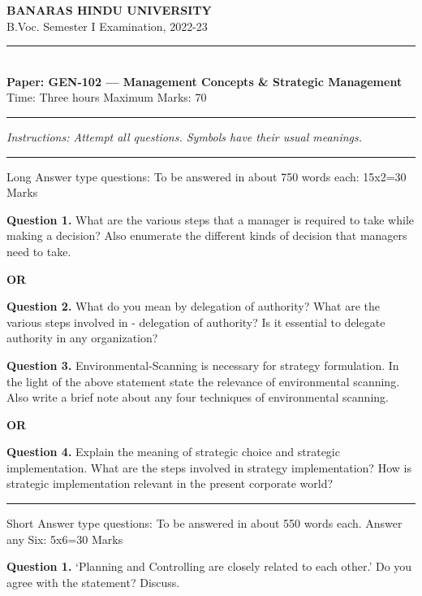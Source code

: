 \documentclass[11pt,a4paper]{article}
\begin{document}
\begin{center}
  {\large\bfseries BANARAS HINDU UNIVERSITY}\\[2pt]
  {\normalsize B.Voc. Semester I Examination, 2022-23}\\[6pt]
  \rule{0.8\linewidth}{0.5pt}\\[6pt]
  {\large\bfseries Paper: GEN-102 --- Management Concepts & Strategic Management}\\[4pt]
  {\normalsize Time: Three hours \hfill Maximum Marks: 70}
\end{center}

\rule{\linewidth}{0.4pt}

\smallskip
\noindent\textit{Instructions: Attempt all questions. Symbols have their usual meanings.}

\bigskip


\bigskip{}
\rule{\linewidth}{0.4pt}\smallskip

Long Answer type questions:
To be answered in about 750 words each: 15x2=30 Marks

\medskip\noindent\textbf{Question 1.} What are the various steps that a manager is required to take while making a decision?
Also enumerate the different kinds of decision that managers need to take.
\centerline{\textbf{OR}}

\medskip\noindent\textbf{Question 2.} What do you mean by delegation of authority? What are the various steps involved in
- delegation of authority? Is it essential to delegate authority in any organization?

\medskip\noindent\textbf{Question 3.} Environmental-Scanning is necessary for strategy formulation. In the light of the
above statement state the relevance of environmental scanning. Also write a brief note about any four
techniques of environmental scanning.
\centerline{\textbf{OR}}

\medskip\noindent\textbf{Question 4.} Explain the meaning of strategic choice and strategic implementation. What are the
steps involved in strategy implementation? How is strategic implementation relevant in the present
corporate world?

\bigskip{}
\rule{\linewidth}{0.4pt}\smallskip

Short Answer type questions:
To be answered in about 550 words each. Answer any Six: 5x6=30 Marks

\medskip\noindent\textbf{Question 1.} ‘Planning and Controlling are closely related to each other.’ Do you agree with the
statement? Discuss.
\end{document}
